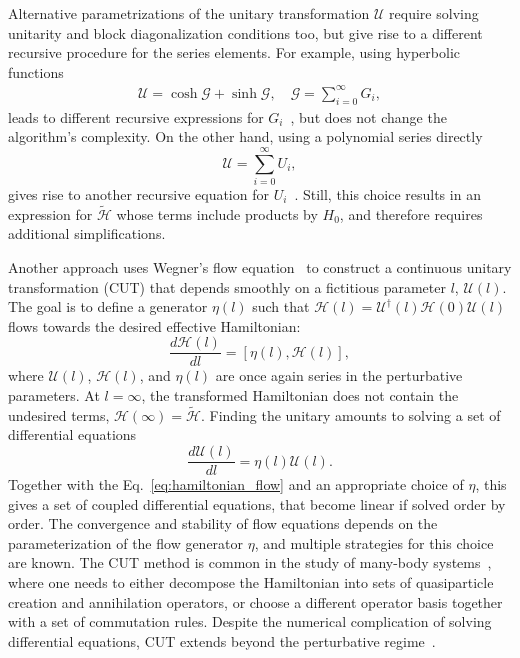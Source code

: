 Alternative parametrizations of the unitary transformation $\mathcal{U}$ require solving unitarity and block diagonalization conditions too, but give rise to a different recursive procedure for the series elements.
For example, using hyperbolic functions
%
\begin{gather}
\mathcal{U} = \cosh{\mathcal{G}} + \sinh{\mathcal{G}}, \quad
\mathcal{G} = \sum_{i=0}^{\infty} G_i,
\end{gather}
%
leads to different recursive expressions for $G_i$~\cite{Shavitt_1980}, but does not change the algorithm's complexity.
On the other hand, using a polynomial series directly
%
\begin{equation}
\mathcal{U} = \sum_{i=0}^{\infty} U_i,
\end{equation}
%
gives rise to another recursive equation for $U_i$~\cite{Van_Vleck_1929, Lowdin_1962, Klein_1974, Suzuki_1983}.
Still, this choice results in an expression for $\tilde{\mathcal{H}}$ whose terms include products by $H_0$, and therefore requires additional simplifications.

Another approach uses Wegner's flow equation~\cite{Wegner_1994,Kehrein_2007} to construct a continuous unitary transformation (CUT) that depends smoothly on a fictitious parameter $l$, $\mathcal{U}(l)$.
The goal is to define a generator $\mathcal{\eta}(l)$ such that $\mathcal{H}(l) = \mathcal{U}^\dagger(l) \mathcal{H}(0) \mathcal{U}(l)$ flows towards the desired effective Hamiltonian:
%
\begin{equation}
\label{eq:hamiltonian_flow}
\frac{d\mathcal{H}(l)}{dl} = [\mathcal{\eta}(l), \mathcal{H}(l)],
\end{equation}
%
where $\mathcal{U}(l)$, $\mathcal{H}(l)$, and $\mathcal{\eta}(l)$ are once again series in the perturbative parameters.
At $l = \infty$, the transformed Hamiltonian does not contain the undesired terms, $\mathcal{H}(\infty) = \tilde{\mathcal{H}}$.
Finding the unitary amounts to solving a set of differential equations
%
\begin{equation}
\frac{d\mathcal{U}(l)}{dl} = \mathcal{\eta}(l)\mathcal{U}(l).
\end{equation}
%
Together with the Eq.~\eqref{eq:hamiltonian_flow} and an appropriate choice of $\mathcal{\eta}$, this gives a set of coupled differential equations, that become linear if solved order by order.
The convergence and stability of flow equations depends on the parameterization of the flow generator $\mathcal{\eta}$, and multiple strategies for this choice are known.
The CUT method is common in the study of many-body systems~\cite{Krull_2012}, where one needs to either decompose the Hamiltonian into sets of quasiparticle creation and annihilation operators, or choose a different operator basis together with a set of commutation rules.
Despite the numerical complication of solving differential equations, CUT extends beyond the perturbative regime~.

